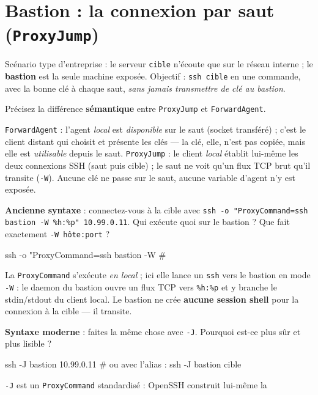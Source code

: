 \documentclass[a4paper,10pt]{exam}
\begin{document}
\section{Bastion : la connexion par saut (\texttt{ProxyJump})}

Scénario type d'entreprise : le serveur \texttt{cible} n'écoute que sur le réseau interne
; le \textbf{bastion} est la seule machine exposée. Objectif : \texttt{ssh cible} en une
commande, avec la bonne clé à chaque saut, \emph{sans jamais transmettre de clé au bastion}.

\begin{questions}
\question Précisez la différence \textbf{sémantique} entre \texttt{ProxyJump} et
\texttt{ForwardAgent}.
\begin{solution}
\texttt{ForwardAgent} : l'agent \emph{local} est \emph{disponible} sur le saut (socket
transféré) ; c'est le client distant qui choisit et présente les clés — la clé, elle,
n'est pas copiée, mais elle est \emph{utilisable} depuis le saut.
\texttt{ProxyJump} : le client \emph{local} établit lui-même les deux connexions SSH
(saut puis cible) ; le saut ne voit qu'un flux TCP brut qu'il transite (\texttt{-W}).
Aucune clé ne passe sur le saut, aucune variable d'agent n'y est exposée.
\end{solution}
\question \textbf{Ancienne syntaxe} : connectez-vous à la cible avec
\texttt{ssh -o "ProxyCommand=ssh bastion -W \%h:\%p" 10.99.0.11}. Qui exécute quoi sur
le bastion ? Que fait exactement \texttt{-W hôte:port} ?
\begin{solution}
\begin{bashcode}
ssh -o "ProxyCommand=ssh bastion -W %
# %
\end{bashcode}
La \texttt{ProxyCommand} s'exécute \emph{en local} ; ici elle lance un \texttt{ssh} vers
le bastion en mode \texttt{-W} : le daemon du bastion ouvre un flux TCP vers
\texttt{\%h:\%p} et y branche le stdin/stdout du client local. Le bastion ne crée
\textbf{aucune session shell} pour la connexion à la cible — il transite.
\end{solution}
\question \textbf{Syntaxe moderne} : faites la même chose avec \texttt{-J}. Pourquoi est-ce
plus sûr et plus lisible ?
\begin{solution}
\begin{bashcode}
ssh -J bastion 10.99.0.11
# ou avec l'alias :
ssh -J bastion cible
\end{bashcode}
\texttt{-J} est un \texttt{ProxyCommand} standardisé : OpenSSH construit lui-même la

\end{solution}
\end{questions}
\end{document}
